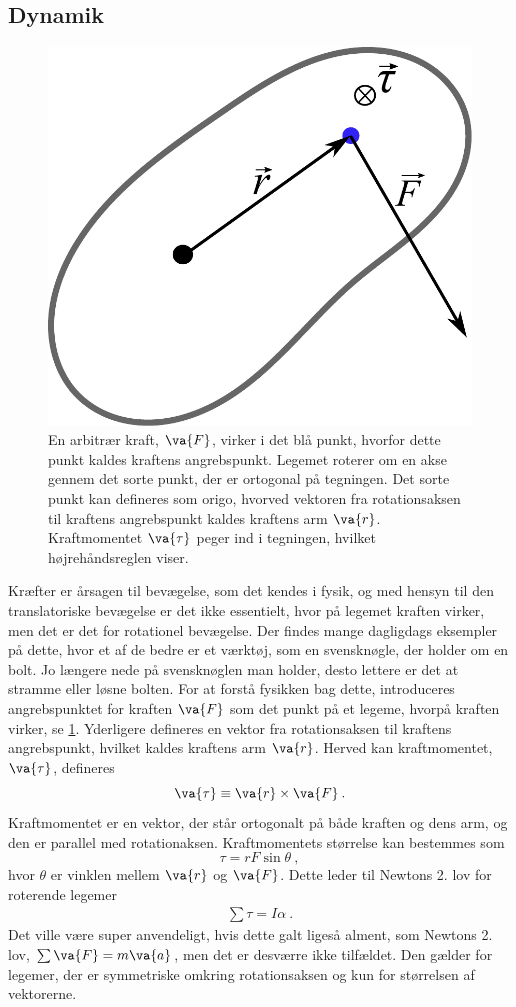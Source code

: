 \subsection{Dynamik}
%
\begin{figure}[h!]
\centering
\includegraphics[width=.4\textwidth]{figurer/Kraftmoment}
\caption{En arbitrær kraft, $\va{F}$, virker i det blå punkt, hvorfor dette punkt kaldes kraftens angrebspunkt. Legemet roterer om en akse gennem det sorte punkt, der er ortogonal på tegningen. Det sorte punkt kan defineres som origo, hvorved vektoren fra rotationsaksen til kraftens angrebspunkt kaldes kraftens arm $\va{r}$. Kraftmomentet $\va{\tau}$ peger ind i tegningen, hvilket højrehåndsreglen viser.}
\label{mek:fig:Angrebspunkt}
\end{figure}
%
Kræfter er årsagen til bevægelse, som det kendes i fysik, og med hensyn til den translatoriske bevægelse er det ikke essentielt, hvor på legemet kraften virker, men det er det for rotationel bevægelse. Der findes mange dagligdags eksempler på dette, hvor et af de bedre er et værktøj, som en svensknøgle, der holder om en bolt. Jo længere nede på svensknøglen man holder, desto lettere er det at stramme eller løsne bolten. For at forstå fysikken bag dette, introduceres angrebspunktet for kraften $\va{F}$ som det punkt på et legeme, hvorpå kraften virker, se \cref{mek:fig:Angrebspunkt}. Yderligere defineres en vektor fra rotationsaksen til kraftens angrebspunkt, hvilket kaldes kraftens arm $\va{r}$. Herved kan kraftmomentet, $\va{\tau}$, defineres
%
\begin{equation} \label{mek:eq:Kraftmoment}
    \va{{\tau}} \equiv \va{r}\times\va{F} \: .
\end{equation}
%
Kraftmomentet er en vektor, der står ortogonalt på både kraften og dens arm, og den er parallel med rotationaksen. Kraftmomentets størrelse kan bestemmes som
%
\begin{equation} \label{mek:eq:KraftmomentNorm}
\tau = rF\sin\theta \: ,
\end{equation}
%
hvor $\theta$ er vinklen mellem $\va{r}$ og $\va{F}$. Dette leder til Newtons 2. lov for roterende legemer
\begin{align}
	\sum\tau = I\alpha \: .
\end{align}
Det ville være super anvendeligt, hvis dette galt ligeså alment, som Newtons 2. lov, $\sum\va{F} = m\va{a}$, men det er desværre ikke tilfældet. Den gælder for legemer, der er symmetriske omkring rotationsaksen og kun for størrelsen af vektorerne.